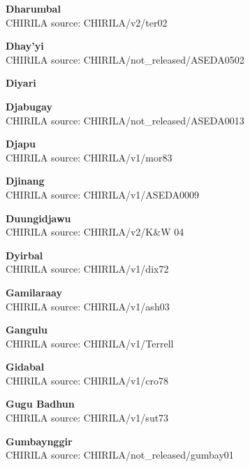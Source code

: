 
\textbf{Dharumbal}\\
CHIRILA source: CHIRILA/v2/ter02


\textbf{Dhay'yi}\\
CHIRILA source: CHIRILA/not\_released/ASEDA0502


\textbf{Diyari}\\

\textbf{Djabugay}\\
CHIRILA source: CHIRILA/not\_released/ASEDA0013


\textbf{Djapu}\\
CHIRILA source: CHIRILA/v1/mor83


\textbf{Djinang}\\
CHIRILA source: CHIRILA/v1/ASEDA0009


\textbf{Duungidjawu}\\
CHIRILA source: CHIRILA/v2/K\&W 04


\textbf{Dyirbal}\\
CHIRILA source: CHIRILA/v1/dix72


\textbf{Gamilaraay}\\
CHIRILA source: CHIRILA/v1/ash03


\textbf{Gangulu}\\
CHIRILA source: CHIRILA/v1/Terrell


\textbf{Gidabal}\\
CHIRILA source: CHIRILA/v1/cro78


\textbf{Gugu Badhun}\\
CHIRILA source: CHIRILA/v1/sut73


\textbf{Gumbaynggir}\\
CHIRILA source: CHIRILA/not\_released/gumbay01

